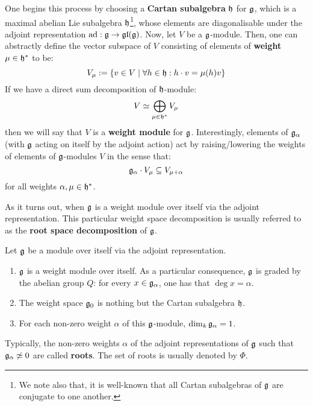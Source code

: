         One begins this process by choosing a \textbf{Cartan subalgebra} $\mathfrak{h}$ for $\mathfrak{g}$, which is a maximal abelian Lie subalgebra $\mathfrak{h}$\footnote{We note also that, it is well-known that all Cartan subalgebras of $\mathfrak{g}$ are conjugate to one another.}, whose elements are diagonalisable under the adjoint representation $\mathrm{ad}: \mathfrak{g} \to \mathfrak{gl}(\mathfrak{g})$. Now, let $V$ be a $\mathfrak{g}$-module. Then, one can abstractly define the vector subspace of $V$ consisting of elements of \textbf{weight} $\mu \in \mathfrak{h}^*$ to be:
            $$V_{\mu} := \{v \in V \mid \forall h \in \mathfrak{h}: h \cdot v = \mu(h) v\}$$
        If we have a direct sum decomposition of $\mathfrak{h}$-module:
            $$V \simeq \bigoplus_{\mu \in \mathfrak{h}^*} V_{\mu}$$
        then we will say that $V$ is a \textbf{weight module} for $\mathfrak{g}$. Interestingly, elements of $\mathfrak{g}_{\alpha}$ (with $\mathfrak{g}$ acting on itself by the adjoint action) act by raising/lowering the weights of elements of $\mathfrak{g}$-modules $V$ in the sense that:
            $$\mathfrak{g}_{\alpha} \cdot V_{\mu} \subseteq V_{\mu + \alpha}$$
        for all weights $\alpha, \mu \in \mathfrak{h}^*$. 
        
        As it turns out, when $\mathfrak{g}$ is a weight module over itself via the adjoint representation. This particular weight space decomposition is usually referred to as the \textbf{root space decomposition} of $\mathfrak{g}$. 
        \begin{theorem} \label{theorem: root_space_decomposition_for_finite_dimensional_simple_lie_algebras}
            Let $\mathfrak{g}$ be a module over itself via the adjoint representation.
            \begin{enumerate}
                \item $\mathfrak{g}$ is a weight module over itself. As a particular consequence, $\mathfrak{g}$ is graded by the abelian group $Q$: for every $x \in \mathfrak{g}_{\alpha}$, one has that $\deg x = \alpha$.
                \item The weight space $\mathfrak{g}_0$ is nothing but the Cartan subalgebra $\mathfrak{h}$.
                \item For each non-zero weight $\alpha$ of this $\mathfrak{g}$-module, $\dim_k \mathfrak{g}_{\alpha} = 1$.
            \end{enumerate}
        \end{theorem}
        Typically, the non-zero weights $\alpha$ of the adjoint representations of $\mathfrak{g}$ such that $\mathfrak{g}_{\alpha} \not \simeq 0$ are called \textbf{roots}. The set of roots is usually denoted by $\Phi$. 

